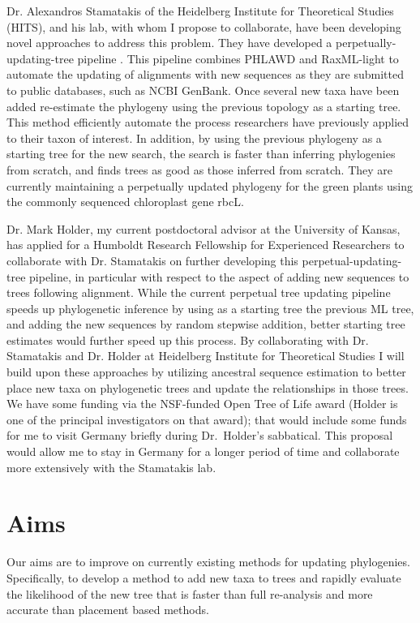 \documentclass[10pt]{article}
\begin{document}
Dr. Alexandros Stamatakis of the Heidelberg Institute for Theoretical Studies (HITS), and his lab, with whom I propose to collaborate, have been developing novel approaches to address this problem. 
They have developed a perpetually-updating-tree pipeline \cite{izquierdo-carrasco_pumper:_2014}. 
This pipeline combines PHLAWD \cite{smith_mega-phylogeny_2009} and RaxML-light \cite{stamatakis_RAxML-Light:_2012} to automate the updating of alignments with new sequences as they are submitted to public databases, such as NCBI GenBank. 
Once several new taxa have been added re-estimate the phylogeny using the previous topology as a starting tree. 
This method efficiently automate the process researchers have previously applied to their taxon of interest. 
In addition, by using the previous phylogeny as a starting tree for the new search, the search is faster than inferring phylogenies from scratch, and finds trees as good as those inferred from scratch. 
They  are currently maintaining a perpetually updated phylogeny for the green plants using the commonly sequenced chloroplast gene rbcL.

Dr. Mark Holder, my current postdoctoral advisor at the University of Kansas, has applied for a Humboldt Research Fellowship for Experienced Researchers to collaborate with Dr. 
Stamatakis on further developing this perpetual-updating-tree pipeline, in particular with respect to the aspect of adding new sequences to trees following alignment. 
While the current perpetual tree updating pipeline speeds up phylogenetic inference by using as a starting tree the previous ML tree, and adding the new sequences by random stepwise addition, better starting tree estimates would further speed up this process.
By collaborating with Dr. Stamatakis and Dr. Holder at Heidelberg Institute for Theoretical Studies I will build upon these approaches by utilizing ancestral sequence estimation to better place new taxa on phylogenetic trees and update the relationships in those trees.
We have some funding via the NSF-funded Open Tree of Life award (Holder is one of the principal investigators on that award); that would include some funds for me to visit Germany briefly during Dr.~Holder's sabbatical.
This proposal would allow me to stay in Germany for a longer period of time and collaborate more extensively with the Stamatakis lab.


\section*{Aims}
Our aims are to improve on currently existing methods for updating phylogenies. 
Specifically, to develop a method to add new taxa to trees and rapidly evaluate the likelihood of the new tree that is faster than full re-analysis and more accurate than placement based methods.
 
\end{document}
